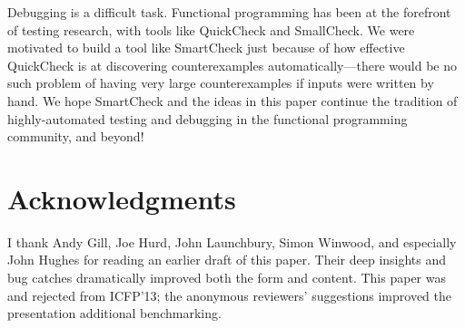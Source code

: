 \documentclass{sigplanconf}
\begin{document}

Debugging is a difficult task.  Functional programming has been at the forefront
of testing research, with tools like QuickCheck and SmallCheck.  We were
motivated to build a tool like SmartCheck just because of how effective
QuickCheck is at discovering counterexamples automatically---there would be no
such problem of having very large counterexamples if inputs were written by
hand.  We hope SmartCheck and the ideas in this paper continue the tradition of
highly-automated testing and debugging in the functional programming community,
and beyond!



\section*{Acknowledgments}
I thank Andy Gill, Joe Hurd, John Launchbury, Simon Winwood, and especially John
Hughes for reading an earlier draft of this paper.  Their deep insights and bug
catches dramatically improved both the form and content.  This paper was and
rejected from ICFP'13; the anonymous reviewers' suggestions improved the
presentation additional benchmarking.




\balancecolumns
\end{document}
